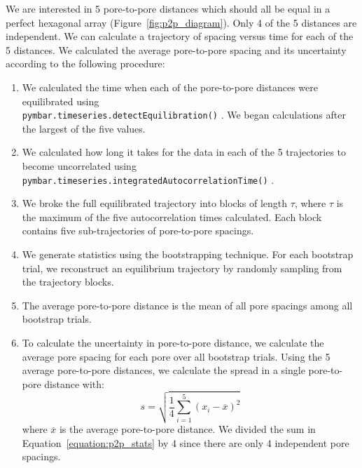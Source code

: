 \documentclass{article}
\begin{document}
  We are interested in 5 pore-to-pore distances which should all be
  equal in a perfect hexagonal array (Figure~\ref{fig:p2p_diagram}). Only 4 of
  the 5 distances are independent. We can calculate a trajectory of spacing
  versus time for each of the 5 distances. We calculated the average pore-to-pore
  spacing and its uncertainty according to the following procedure:
   \begin{enumerate}
	\item We calculated the time when each of the pore-to-pore distances
	were equilibrated using \\ \texttt{pymbar.timeseries.detectEquilibration()}
	\cite{chodera_simple_2016,shirts_statistically_2008}. We began calculations
	after the largest of the five values.
	\item We calculated how long it takes for the data in each of the 5
	trajectories to become uncorrelated using \texttt{pymbar.timeseries.integratedAutocorrelationTime()}
	\cite{chodera_simple_2016,shirts_statistically_2008}. 
	\item We broke the full equilibrated trajectory into blocks of length $\tau$, where
	$\tau$ is the maximum of the five autocorrelation times calculated. Each block contains
	five sub-trajectories of pore-to-pore spacings.   
	\item We generate statistics using the bootstrapping technique. For
	each bootstrap trial, we reconstruct an equilibrium trajectory by randomly
	sampling from the trajectory blocks. 
	\item The average pore-to-pore distance is the mean of all pore
	spacings among all bootstrap trials.
	\item To calculate the uncertainty in pore-to-pore distance, we calculate the average 
	pore spacing for each pore over all bootstrap trials. Using the 5 average 
	pore-to-pore distances, we calculate the spread in a single pore-to-pore distance 
	with:
	\begin{equation}
	s = \sqrt{\frac{1}{4} \sum_{i=1}^5 (x_i - \overline{x})^2} 
	\label{equation:p2p_stats}
	\end{equation}
	where $\overline{x}$ is the average pore-to-pore distance. We divided the sum in 
	Equation~\ref{equation:p2p_stats} by 4 since there are only 4 independent pore
	spacings.
  \end{enumerate}
  
  
\end{document}
